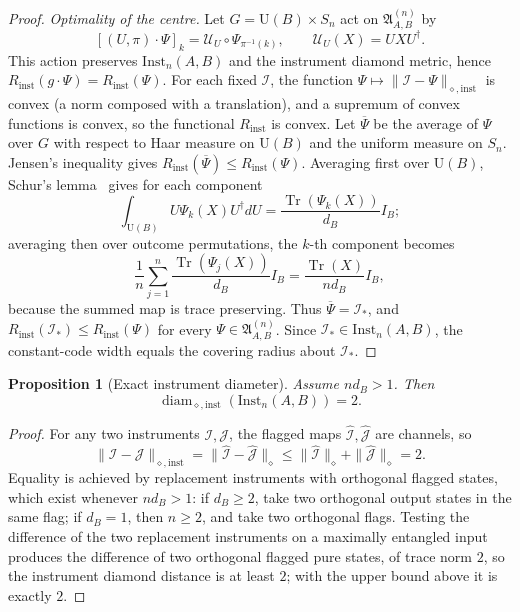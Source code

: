 \documentclass[11pt,a4paper]{article}
\newtheorem{proposition}[theorem]{Proposition}
\newcommand{\Inst}{\mathrm{Inst}}
\newcommand{\Tr}{\operatorname{Tr}}
\newcommand{\diam}{\operatorname{diam}}
\begin{document}
\begin{proof}
\emph{Optimality of the centre.} Let $G=\mathrm U(B)\times S_n$ act on $\mathfrak A_{A,B}^{(n)}$ by
\[
[(U,\pi)\cdot\Psi]_k=\mathcal U_U\circ\Psi_{\pi^{-1}(k)},
\qquad \mathcal U_U(X)=UXU^\dagger.
\]
This action preserves $\Inst_n(A,B)$ and the instrument diamond metric, hence $R_{\mathrm{inst}}(g\cdot\Psi)=R_{\mathrm{inst}}(\Psi)$. For each fixed $\mathcal I$, the function $\Psi\mapsto\|\mathcal I-\Psi\|_{\diamond,\mathrm{inst}}$ is convex (a norm composed with a translation), and a supremum of convex functions is convex, so the functional $R_{\mathrm{inst}}$ is convex. Let $\overline\Psi$ be the average of $\Psi$ over $G$ with respect to Haar measure on $\mathrm U(B)$ and the uniform measure on $S_n$. Jensen's inequality gives $R_{\mathrm{inst}}(\overline\Psi)\le R_{\mathrm{inst}}(\Psi)$. Averaging first over $\mathrm U(B)$, Schur's lemma~\cite{Watrous2018} gives for each component
\[
\int_{\mathrm U(B)}U\Psi_k(X)U^\dagger dU=\frac{\Tr(\Psi_k(X))}{d_B}I_B;
\]
averaging then over outcome permutations, the $k$-th component becomes
\[
\frac1n\sum_{j=1}^n\frac{\Tr(\Psi_j(X))}{d_B}I_B
=\frac{\Tr(X)}{nd_B}I_B,
\]
because the summed map is trace preserving. Thus $\overline\Psi=\mathcal I_*$, and $R_{\mathrm{inst}}(\mathcal I_*)\le R_{\mathrm{inst}}(\Psi)$ for every $\Psi\in\mathfrak A_{A,B}^{(n)}$. Since $\mathcal I_*\in\Inst_n(A,B)$, the constant-code width equals the covering radius about $\mathcal I_*$.
\end{proof}

\begin{proposition}[Exact instrument diameter]
\label{prop:diameter}
Assume $nd_B>1$. Then
\[
\diam_{\diamond,\mathrm{inst}}(\Inst_n(A,B))=2.
\]
\end{proposition}

\begin{proof}
For any two instruments $\mathcal I,\mathcal J$, the flagged maps $\widehat{\mathcal I},\widehat{\mathcal J}$ are channels, so
\[
\|\mathcal I-\mathcal J\|_{\diamond,\mathrm{inst}}
=\|\widehat{\mathcal I}-\widehat{\mathcal J}\|_\diamond
\le\|\widehat{\mathcal I}\|_\diamond+\|\widehat{\mathcal J}\|_\diamond=2.
\]
Equality is achieved by replacement instruments with orthogonal flagged states, which exist whenever $nd_B>1$: if $d_B\ge2$, take two orthogonal output states in the same flag; if $d_B=1$, then $n\ge2$, and take two orthogonal flags. Testing the difference of the two replacement instruments on a maximally entangled input produces the difference of two orthogonal flagged pure states, of trace norm $2$, so the instrument diamond distance is at least $2$; with the upper bound above it is exactly $2$.
\end{proof}
\end{document}
